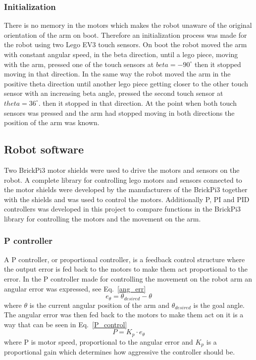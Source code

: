 \subsubsection{Initialization}
There is no memory in the motors which makes the robot unaware of the original orientation of the arm on boot. Therefore an initialization process was made for the robot using two Lego EV3 touch sensors. On boot the robot moved the arm with constant angular speed, in the beta direction, until a lego piece, moving with the arm, pressed one of the touch sensors at \(beta = -90^{\circ}\) then it stopped moving in that direction. In the same way the robot moved the arm in the positive theta direction until another lego piece getting closer to the other touch sensor with an increasing beta angle, pressed the second touch sensor at \(theta = 36^{\circ}\). then it stopped in that direction. At the point when both touch sensors was pressed and the arm had stopped moving in both directions the position of the arm was known.
\subsection{Robot software}
Two BrickPi3 motor shields were used to drive the motors and sensors on the robot. A complete library for controlling lego motors and sensors connected to the motor shields were developed by the manufacturers of the BrickPi3 together with the shields and was used to control the motors. Additionally P, PI and PID controllers was developed in this project to compare functions in the BrickPi3 library for controlling the motors and the movement on the arm.
\subsubsection{P controller}
A P controller, or proportional controller, is a feedback control structure where the output error is fed back to the motors to make them act proportional to the error. In the P controller made for controlling the movement on the robot arm an angular error was expressed, see Eq.~\eq\ref{ang_err}
\begin{equation}
    e_{\theta} = \theta_{desired} - \theta
    \label{ang_err}
\end{equation}
where \(\theta\) is the current angular position of the arm and \(\theta_{desired}\) is the goal angle. The angular error was then fed back to the motors to make them act on it is a way that can be seen in Eq.~\eq\ref{P_control}
\begin{equation}
    P = K_p\cdot e_{\theta}
    \label{P_control}
\end{equation}
where P is motor speed, proportional to the angular error and \(K_p\) is a proportional gain which determines how aggressive the controller should be.

